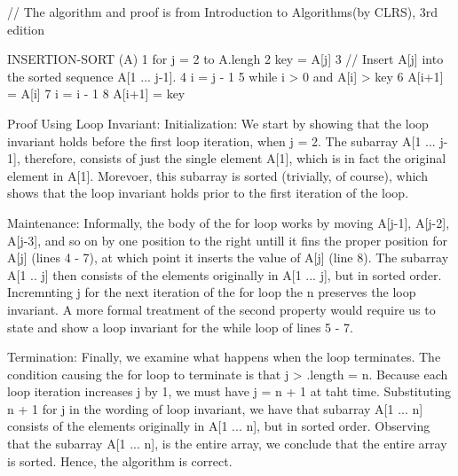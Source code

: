 // The algorithm and proof is from Introduction to Algorithms(by CLRS), 3rd edition

INSERTION-SORT (A)
1 for j = 2 to A.lengh
2  key = A[j]
3   // Insert A[j] into the sorted sequence A[1 ... j-1].
4   i = j - 1
5   while i > 0 and A[i] > key
6     A[i+1] = A[i]
7     i = i - 1
8   A[i+1] = key

Proof Using Loop Invariant:
  Initialization: We start by showing that the loop invariant holds before the first loop iteration, when j = 2. The subarray A[1 ... j-1], therefore, consists of just the single element A[1], which is in fact the original element in A[1]. Morevoer, this subarray is sorted (trivially, of course), which shows that the loop invariant holds prior to the first iteration of the loop.
  
  Maintenance: Informally, the body of the for loop works by moving A[j-1], A[j-2], A[j-3], and so on by one position to the right untill it fins the proper position for A[j] (lines 4 - 7), at which point it inserts the value of A[j] (line 8). The subarray A[1 .. j] then consists of the elements originally in A[1 ... j], but in sorted order. Incremnting j for the next iteration of the for loop the n preserves the loop invariant.
    A more formal treatment of the second property would require us to state and show a loop invariant for the while loop of lines 5 - 7.
  
  Termination: Finally, we examine what happens when the loop terminates. The condition causing the for loop to terminate is that j > .length = n. Because each loop iteration increases j by 1, we must have j = n + 1 at taht time. Substituting n + 1 for j in the wording of loop invariant, we have that subarray A[1 ... n] consists of the elements originally in A[1 ... n], but in sorted order. Observing that the subarray A[1 ... n], is the entire array, we conclude that the entire array is sorted. Hence, the algorithm is correct.
  
